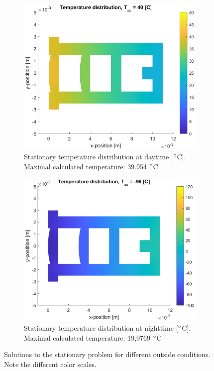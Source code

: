 \documentclass[a4paper,11pt]{article}
\begin{document}
\begin{figure}[H]
    \centering
    \begin{subfigure}{0.45\linewidth}{
        \centering
        \includegraphics[width=1\linewidth]{aT40.eps}
        \caption{Stationary temperature distribution at daytime [$\degree$C]. Maximal calculated temperature: 39.954 $\degree$C}
        \label{fig:stry_temp_day}
    }\end{subfigure}
    \begin{subfigure}{0.45\linewidth}{
        \centering
        \includegraphics[width=1\linewidth]{aTminus96.eps}
        \caption{Stationary temperature distribution at nighttime [$\degree$C]. Maximal calculated temperature: 19,9769 $\degree$C}
        \label{fig:stry_temp_night}
    }\end{subfigure}
    \caption{Solutions to the stationary problem for different outside conditions. Note the different color scales.}
    \label{fig:stry_temp}
\end{figure}
\end{document}
